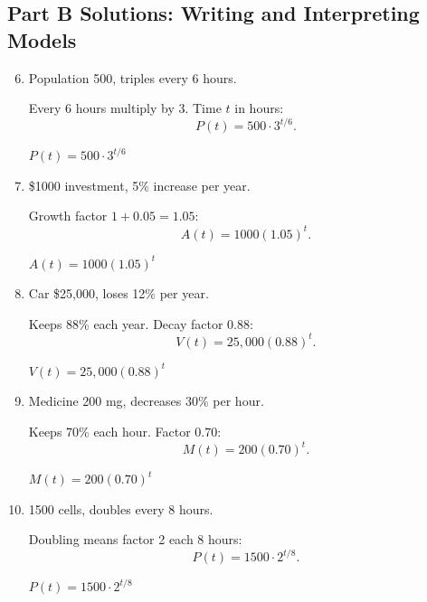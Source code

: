 \documentclass[14pt]{extarticle}
\begin{document}
\subsection*{Part B Solutions: Writing and Interpreting Models}
\begin{enumerate}
  \setcounter{enumi}{5}
  \item Population 500, triples every 6 hours.

  Every 6 hours multiply by 3. Time \(t\) in hours:
  \[
  P(t) = 500 \cdot 3^{t/6}.
  \]

  \(\boxed{P(t) = 500 \cdot 3^{t/6}}\)

  \item \$1000 investment, 5\% increase per year.

  Growth factor \(1 + 0.05 = 1.05\):
  \[
  A(t) = 1000(1.05)^t.
  \]

  \(\boxed{A(t) = 1000(1.05)^t}\)

  \item Car \$25{,}000, loses 12\% per year.

  Keeps 88\% each year. Decay factor \(0.88\):
  \[
  V(t) = 25{,}000(0.88)^t.
  \]

  \(\boxed{V(t) = 25{,}000(0.88)^t}\)

  \item Medicine 200 mg, decreases 30\% per hour.

  Keeps 70\% each hour. Factor \(0.70\):
  \[
  M(t) = 200(0.70)^t.
  \]

  \(\boxed{M(t) = 200(0.70)^t}\)

  \item 1500 cells, doubles every 8 hours.

  Doubling means factor 2 each 8 hours:
  \[
  P(t) = 1500 \cdot 2^{t/8}.
  \]

  \(\boxed{P(t) = 1500 \cdot 2^{t/8}}\)
\end{enumerate}
\end{document}
